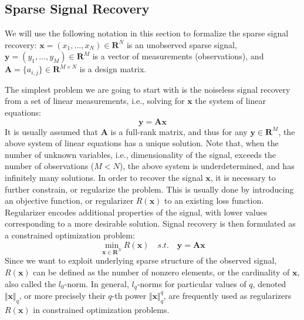 \documentclass[journal]{IEEEtran}
\begin{document}
\subsection{Sparse Signal Recovery}
We will use the following notation in this section to formalize the sparse signal recovery: $\boldsymbol{x}=(x_1,...,x_N)\in \mathbf{R}^N$ is an unobserved sparse signal, $\boldsymbol{y}=(y_1,...,y_M)\in \mathbf{R}^M$ is a vector of measurements (observations), and $\boldsymbol{A}=\{a_{i,j}\}\in\mathbf{R}^{M\times N}$ is a design matrix. 

The simplest problem we are going to start with is the noiseless signal recovery from a set of linear measurements, i.e., solving for $\boldsymbol{x}$ the system of linear equations:
%
\begin{equation}
	\boldsymbol{y}=\boldsymbol{A} \boldsymbol{x}
\end{equation}
%
It is usually assumed that $\boldsymbol{A}$ is a full-rank matrix, and thus for any $\boldsymbol{y}\in\mathbf{R}^M$, the above system of linear equations has a unique solution. Note that, when the number of unknown variables, i.e., dimensionality of the signal, exceeds the number of observations ($M<N$), the above system is underdetermined, and has infinitely many solutions. In order to recover the signal $\boldsymbol{x}$, it is necessary to further constrain, or regularize the problem. This is usually done by introducing an objective function, or regularizer $R(\boldsymbol{x})$ to an existing loss function. Regularizer encodes additional properties of the signal, with lower values corresponding to a more desirable solution. Signal recovery is then formulated as a constrained optimization problem:
%
\begin{equation}
	\min\limits_{\boldsymbol{x}\in\mathbf{R}^N} R(\boldsymbol{x})\quad s.t.\quad \boldsymbol{y}=\boldsymbol{A}\boldsymbol{x}
\end{equation}
%
Since we want to exploit underlying sparse structure of the observed signal, $R(\boldsymbol{x})$ can be defined as the number of nonzero elements, or the cardinality of $\boldsymbol{x}$, also called the $l_0$-norm. In general, $l_q$-norms for particular values of $q$, denoted $\Vert \boldsymbol{x}\Vert_q$, or more precisely their $q$-th power $\Vert \boldsymbol{x}\Vert_q^q$, are frequently used as regularizers $R(\boldsymbol{x})$ in constrained optimization problems.
\end{document}
